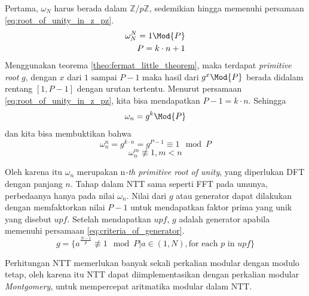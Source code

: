 Pertama, $ \omega_N $ harus berada dalam $ \mathbb{Z}/p\mathbb{Z} $, sedemikian hingga memenuhi persamaan \eqref{eq:root_of_unity_in_z_pz}.
\begin{equation}
	\begin{aligned}
		\omega_N^N = 1 \Mod{P} \\
		P = k \cdot n + 1 \\
	\end{aligned}
	\label{eq:root_of_unity_in_z_pz}
\end{equation}
Menggunakan teorema \ref{theo:fermat_little_theorem}, maka terdapat \textit{primitive root} $ g $, dengan $ x $ dari $ 1 \text{ sampai } P-1 $ maka hasil dari $ g^x \Mod{P} $ berada didalam rentang $ [1,P-1] $ dengan urutan tertentu. Menurut persamaan \eqref{eq:root_of_unity_in_z_pz}, kita bisa mendapatkan $ P-1 = k \cdot n $\cite{ntt}. Sehingga 
$$ \omega_n = g^{k} \Mod{P} $$
dan kita bisa membuktikan bahwa
$$ \omega_n^n = g^{k \cdot n} = g^{P-1} \equiv 1 \mod{P} $$
$$ \omega_n^m \not\equiv 1 , m < n $$

Oleh karena itu $ \omega_n $ merupakan n\textit{-th primitive root of unity}, yang diperlukan DFT dengan panjang $ n $. Tahap dalam NTT sama seperti FFT pada umunya, perbedaanya hanya pada nilai $ \omega_n $. Nilai dari $ g $ atau generator dapat dilakukan dengan memfaktorkan nilai $ P - 1 $ untuk mendapatkan faktor prima yang unik yang disebut $ upf $. Setelah mendapatkan $ upf $, $ g $ adalah generator apabila memenuhi persamaan \eqref{eq:criteria_of_generator}.
\begin{equation}
	g = \{ a^{\frac{N-1}{p}} \not\equiv 1 \mod{P} | a \in (1,N) , \text{for each } p \text{ in } upf \}
	\label{eq:criteria_of_generator}
\end{equation} 

Perhitungan NTT memerlukan banyak sekali perkalian modular dengan modulo tetap, oleh karena itu NTT dapat diimplementasikan dengan perkalian modular \textit{Montgomery}, untuk mempercepat aritmatika modular dalam NTT.

